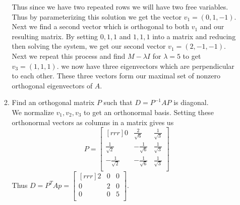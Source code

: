 \documentclass[12pt]{article}
\theoremstyle{definition}
\theoremstyle{plain}
\begin{document}
\begin{enumerate}
\begin{enumerate}
		Thus since we have two repeated rows we will have two free variables. Thus by parameterizing this solution we get the vector $v_1=(0,1,-1)$. Next we find a second vector which is orthogonal to both $v_1$ and our resulting matrix. By setting $0,1,1$ and $1,1,1$ into a matrix and reducing then solving the system, we get our second vector $v_1=(2,-1,-1)$.\\
		Next we repeat this process and find $M-\lambda I$ for $\lambda=5$ to get $v_3=(1,1,1)$. we now have three eigenvectors which are perpendicular to each other. These three vectors form our maximal set of nonzero orthogonal eigenvectors of $A$.
	\item Find an orthogonal matrix $P$ such that $D=P^{-1}AP$ is diagonal.\\
		We normalize $v_1,v_2,v_3$ to get an orthonormal basis. Setting these orthonormal vectors as columns in a matrix gives us
		\[ P = \begin{bmatrix}[rrr]0&\frac{2}{\sqrt{6}}&\frac{1}{\sqrt{3}}\\\frac{1}{\sqrt{2}}&-\frac{1}{\sqrt{6}}&\frac{1}{\sqrt{3}}\\-\frac{1}{\sqrt{2}}&-\frac{1}{\sqrt{6}}&\frac{1}{\sqrt{3}}\\\end{bmatrix} \]
		Thus $D=P^TAp = \begin{bmatrix}[rrr]2&0&0\\0&2&0\\0&0&5\\\end{bmatrix}$.
	\end{enumerate}
	

\end{enumerate}
\end{document}
